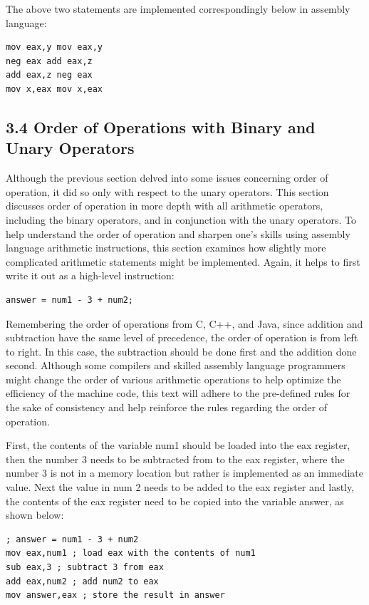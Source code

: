 \documentclass[10pt]{book}
\begin{document}
The above two statements are implemented correspondingly below in assembly language:

\begin{verbatim}
mov eax,y mov eax,y
neg eax add eax,z
add eax,z neg eax
mov x,eax mov x,eax
\end{verbatim}

\subsection*{3.4 Order of Operations with Binary and Unary Operators}
Although the previous section delved into some issues concerning order of operation, it did so only with respect to the unary operators. This section discusses order of operation in more depth with all arithmetic operators, including the binary operators, and in conjunction with the unary operators. To help understand the order of operation and sharpen one's skills using assembly language arithmetic instructions, this section examines how slightly more complicated arithmetic statements might be implemented. Again, it helps to first write it out as a high-level instruction:

\begin{verbatim}
answer = num1 - 3 + num2;
\end{verbatim}

Remembering the order of operations from C, C++, and Java, since addition and subtraction have the same level of precedence, the order of operation is from left to right. In this case, the subtraction should be done first and the addition done second. Although some compilers and skilled assembly language programmers might change the order of various arithmetic operations to help optimize the efficiency of the machine code, this text will adhere to the pre-defined rules for the sake of consistency and help reinforce the rules regarding the order of operation.

First, the contents of the variable num1 should be loaded into the eax register, then the number 3 needs to be subtracted from to the eax register, where the number 3 is not in a memory location but rather is implemented as an immediate\\
value. Next the value in num 2 needs to be added to the eax register and lastly, the contents of the eax register need to be copied into the variable answer, as shown below:

\begin{verbatim}
; answer = num1 - 3 + num2
mov eax,num1 ; load eax with the contents of num1
sub eax,3 ; subtract 3 from eax
add eax,num2 ; add num2 to eax
mov answer,eax ; store the result in answer
\end{verbatim}
\end{document}
